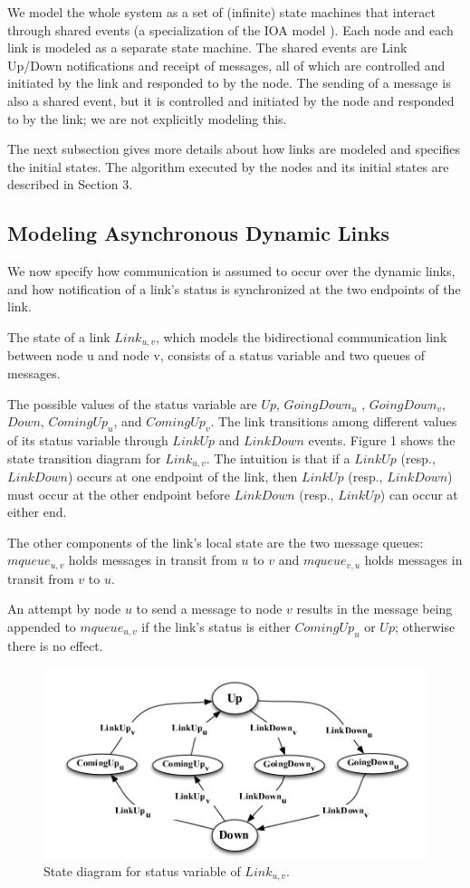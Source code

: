 \documentclass{article}
\begin{document}
We model the whole system as a set of (infinite) state machines that interact through shared events (a specialization of the IOA model \cite{12}). Each node and each link is modeled as a separate state machine. The shared events are Link Up/Down notifications and receipt of messages, all of which are controlled and initiated by the link and responded to by the node. The sending of a message is also a shared event, but it is controlled and initiated by the node and responded to by the link; we are not explicitly modeling this.

The next subsection gives more details about how links are modeled and specifies the initial states. The algorithm executed by the nodes and its initial states are described in Section 3.
\subsection{Modeling Asynchronous Dynamic Links}
We now specify how communication is assumed to occur over the dynamic links, and how notification of a link’s status is synchronized at the two endpoints of the link.

The state of a link $Link_{u, v}$, which models the bidirectional communication link between node u and node v, consists of a status variable and two queues of messages.

The possible values of the status variable are $Up$, $GoingDown_{u}$ , $GoingDown_{v}$, $Down$, $ComingUp_{u}$, and $ComingUp_{v}$. The link transitions among different values of its status variable through $LinkUp$ and $LinkDown$ events. Figure 1 shows the state transition diagram for $Link_{u, v}$. The intuition is that if a $LinkUp$ (resp., $LinkDown$) occurs at one endpoint of the link, then $LinkUp$ (resp., $LinkDown$) must occur at the other endpoint before $LinkDown$ (resp., $LinkUp$) can occur at either end.

The other components of the link’s local state are the two message queues: $mqueue_{u,v}$ holds messages in transit from $u$ to $v$ and $mqueue_{v,u}$ holds messages in transit from $v$ to $u$.

An attempt by node $u$ to send a message to node $v$ results in the message being appended to $mqueue_{u,v}$ if the link’s status is either $ComingUp_u$ or $Up$; otherwise there is no effect.

\begin{figure}[hbtp]
\centering
\includegraphics[scale=.6]{screenshot.png}
\caption{State diagram for status variable of $Link_{u, v}$.}
\end{figure}
\end{document}
